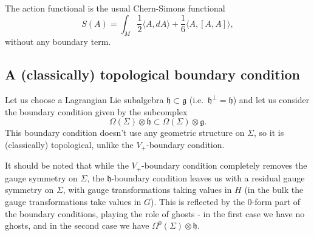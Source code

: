 \documentclass[a4paper]{amsart}
\theoremstyle{plain}
\theoremstyle{definition}
\newcommand{\g}{\mathfrak{g}}
\newcommand{\h}{\mathfrak{h}}
\newcommand{\la}{\langle}
\newcommand{\ra}{\rangle}
\begin{document}
The action functional is the usual Chern-Simons functional
$$S(A)=\int_M \frac 12 \la A,dA\ra + \frac16 \la A,[A,A]\ra,$$
without any boundary term.


\subsection{A (classically) topological boundary condition}
Let us choose a Lagrangian Lie subalgebra $\h\subset\g$ (i.e.\ $\h^\perp=\h$) and let us consider the boundary condition given by the subcomplex
\begin{equation}\label{h-bc}
\Omega(\Sigma)\otimes\h\subset\Omega(\Sigma)\otimes\g.
\end{equation}
This boundary condition doesn't use any geometric structure on $\Sigma$, so it is (classically) topological, unlike the $V_+$-boundary condition. 

It should be noted that while the $V_+$-boundary condition completely removes the gauge symmetry on $\Sigma$, the  $\h$-boundary condition leaves us with a residual gauge symmetry on $\Sigma$, with gauge transformations taking values in $H$ (in the bulk the gauge transformations take values in $G$). This is reflected by the 0-form part of the boundary conditions, playing the role of ghosts - in the first case we have no ghosts, and in the second case we have $\Omega^0(\Sigma)\otimes\h$. 
\end{document}
